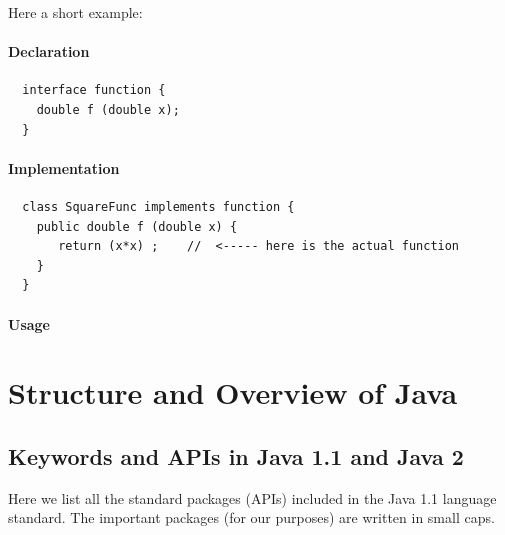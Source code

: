 Here a short example:
\paragraph{Declaration} 
\begin{verbatim}
  interface function {
    double f (double x); 
  }
\end{verbatim}

\paragraph{Implementation}
\begin{verbatim}
  class SquareFunc implements function {
    public double f (double x) {
       return (x*x) ;    //  <----- here is the actual function
    }
  }
\end{verbatim}

\paragraph{Usage}

\section{Structure and Overview of Java}

\subsection{Keywords and APIs in Java 1.1 and Java 2}

Here we list all the standard packages (APIs) included in the Java 1.1
language standard. The important packages (for our purposes) are
written in small caps.

